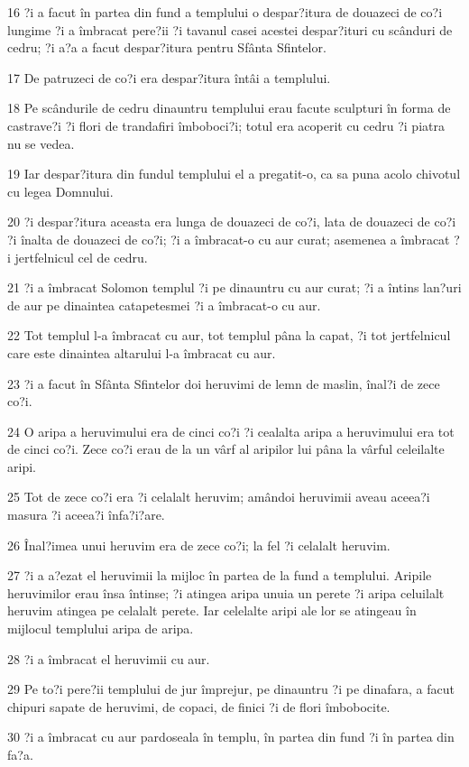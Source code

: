 \par 16 ?i a facut în partea din fund a templului o despar?itura de douazeci de co?i lungime ?i a îmbracat pere?ii ?i tavanul casei acestei despar?ituri cu scânduri de cedru; ?i a?a a facut despar?itura pentru Sfânta Sfintelor.
\par 17 De patruzeci de co?i era despar?itura întâi a templului.
\par 18 Pe scândurile de cedru dinauntru templului erau facute sculpturi în forma de castrave?i ?i flori de trandafiri îmboboci?i; totul era acoperit cu cedru ?i piatra nu se vedea.
\par 19 Iar despar?itura din fundul templului el a pregatit-o, ca sa puna acolo chivotul cu legea Domnului.
\par 20 ?i despar?itura aceasta era lunga de douazeci de co?i, lata de douazeci de co?i ?i înalta de douazeci de co?i; ?i a îmbracat-o cu aur curat; asemenea a îmbracat ?i jertfelnicul cel de cedru.
\par 21 ?i a îmbracat Solomon templul ?i pe dinauntru cu aur curat; ?i a întins lan?uri de aur pe dinaintea catapetesmei ?i a îmbracat-o cu aur.
\par 22 Tot templul l-a îmbracat cu aur, tot templul pâna la capat, ?i tot jertfelnicul care este dinaintea altarului l-a îmbracat cu aur.
\par 23 ?i a facut în Sfânta Sfintelor doi heruvimi de lemn de maslin, înal?i de zece co?i.
\par 24 O aripa a heruvimului era de cinci co?i ?i cealalta aripa a heruvimului era tot de cinci co?i. Zece co?i erau de la un vârf al aripilor lui pâna la vârful celeilalte aripi.
\par 25 Tot de zece co?i era ?i celalalt heruvim; amândoi heruvimii aveau aceea?i masura ?i aceea?i înfa?i?are.
\par 26 Înal?imea unui heruvim era de zece co?i; la fel ?i celalalt heruvim.
\par 27 ?i a a?ezat el heruvimii la mijloc în partea de la fund a templului. Aripile heruvimilor erau însa întinse; ?i atingea aripa unuia un perete ?i aripa celuilalt heruvim atingea pe celalalt perete. Iar celelalte aripi ale lor se atingeau în mijlocul templului aripa de aripa.
\par 28 ?i a îmbracat el heruvimii cu aur.
\par 29 Pe to?i pere?ii templului de jur împrejur, pe dinauntru ?i pe dinafara, a facut chipuri sapate de heruvimi, de copaci, de finici ?i de flori îmbobocite.
\par 30 ?i a îmbracat cu aur pardoseala în templu, în partea din fund ?i în partea din fa?a.
